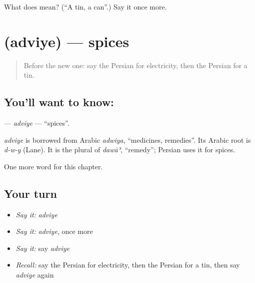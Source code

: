 \begin{tcolorbox}[breakable,colback=teal!4,colframe=teal!35!black,title={Before you move on}]
What does  mean? (\textquotedblleft{}A tin, a can\textquotedblright{}.) Say it once more.
\end{tcolorbox}
\section[\texorpdfstring{\fa{ادویه} (adviye)}{ادویه (adviye)}]{ (adviye) — spices}

\label{lesson:FA-C247-adviye}



\begin{quote}
Before the new one: say the Persian for electricity, then the Persian for a tin.
\end{quote}

\subsection*{You'll want to know: }
\textbf{} — \emph{adviye} — \textquotedblleft{}spices\textquotedblright{}.

\begin{cousinweb}
\emph{adviye} is borrowed from Arabic \emph{adwiya}, \textquotedblleft{}medicines, remedies\textquotedblright{}. Its Arabic root is \emph{d-w-y} (Lane). It is the plural of \emph{dawāʾ}, \textquotedblleft{}remedy\textquotedblright{}; Persian uses it for spices.
\end{cousinweb}

\begin{grammarlens}[title={What you've built}]
One more word for this chapter.
\end{grammarlens}

\subsection*{Your turn}
\begin{itemize}
\raggedright
  \item \emph{Say it:} \emph{adviye}
  \item \emph{Say it:} \emph{adviye}, once more
  \item \emph{Say it:} say \emph{adviye}
  \item \emph{Recall:} say the Persian for electricity, then the Persian for a tin, then say \emph{adviye} again
\end{itemize}

